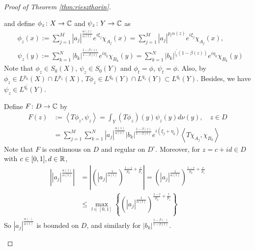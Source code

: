 \begin{proof}[Proof of Theorem \ref{thm:rieszthorin}]
\begin{enumerate}[label=(\Roman*)]
\begin{enumerate}[label=\theenumi-\arabic{*}]
\begin{enumerate}[label=(\roman*)]
				and define $\phi_z \colon X \rightarrow \mathbb{C}$ and $\psi_z \colon Y \rightarrow \mathbb{C}$ as
				\begin{equation*}
					\begin{aligned}
						& \phi_z(x):=\sum_{j=1}^M\left|a_j\right|^{\frac{\alpha(z)}{\alpha(t)}} e^{i \xi_j} \chi_{A_j}(x)=\sum_{j=1}^M\left|a_j\right|^{p_t \alpha(z)} e^{i \xi_j} \chi_{A_j}(x), \\
						& \psi_z(y):=\sum_{k=1}^N\left|b_k\right|^{\frac{1-\beta(z)}{1-\beta(t)}} e^{i \eta_k} \chi_{B_k}(y)=\sum_{k=1}^N\left|b_k\right|^{\left.\right|_t ^{\prime}(1-\beta(z))} e^{i \eta_k} \chi_{B_k}(y)
					\end{aligned}
				\end{equation*}
				Note that $\phi_z \in S_0(X)$, $\psi_z \in S_0(Y)$ and $\phi_t = \phi$, $\psi_t = \phi$. Also, by $\phi_z \in L^{p_0}(X) \cap L^{p_1}(X)$, $T \phi_z \in L^{q_0}(Y) \cap L^{q_1}(Y) \subset L^{q_t}(Y)$. Besides, we have $\psi_z \in L^{q_t^{\prime}}(Y)$.

				\noindent Define $F \colon D \rightarrow \mathbb{C}$ by
				\begin{equation*}
					\begin{aligned}
						F(z)&:=\left\langle T \phi_z, \psi_z\right\rangle=\int_Y\left(T \phi_z\right)(y) \psi_z(y) d \nu(y),\quad z \in D \\
						&= \sum_{j=1}^M \sum_{k=1}^N\left|a_j\right|^{\frac{\alpha(z)}{\alpha(t)}}\left|b_k\right|^{\frac{1-\beta(z)}{1-\beta(t)}} e^{i\left(\xi_j+\eta_k\right)}\left\langle T \chi_{A_j}, \chi_{B_k}\right\rangle
					\end{aligned}
				\end{equation*}
				Note that $F$ is continuous on $D$ and regular on $D^\circ$. Moreover, for $z = c + id \in D$ with $c \in [0,1],d\in \mathbb{R}$,
				\begin{equation*}
					\begin{aligned}
						\left|\left|a_j\right|^{\frac{\alpha(z)}{\alpha(t)}}\right| & =\left|\left(\left|a_j\right|^{\frac{1}{\alpha(t)}}\right)^{\frac{1-z}{p_0}+\frac{z}{p_1}}\right|=\left(\left|a_j\right|^{\frac{1}{\alpha(t)}}\right)^{\frac{1-c}{p_0}+\frac{c}{p_1}} \\
						& \leq \max _{l \in[0,1]}\left\{\left(\left|a_j\right|^{\frac{1}{\alpha(t)}}\right)^{\frac{1-l}{p_0}+\frac{l}{p_1}}\right\}
					\end{aligned}
				\end{equation*}
				So $\left|a_j\right|^{\frac{\alpha(\cdot)}{\alpha(t)}}$ is bounded on $D$, and similarly for $\left|b_k\right|^{\frac{1-\beta(\cdot)}{1-\beta(t)}}$.


\end{enumerate}
\end{enumerate}
\end{enumerate}
\end{proof}
